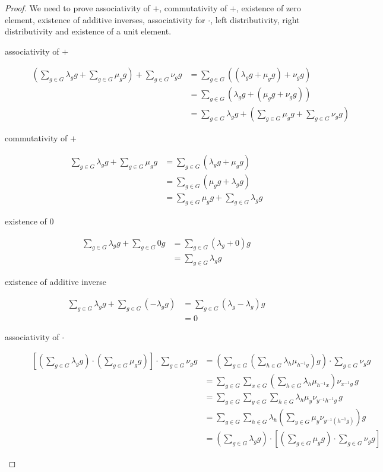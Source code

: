 \documentclass[titlepage, a4paper]{article}
\theoremstyle{remark}
\begin{document}
	\begin{proof}
		We need to prove associativity of $+$, commutativity of $+$, existence of zero element, existence of additive inverses, associativity for $\cdot$, left distributivity, right distributivity and existence of a unit element.
		\begin{description}
		\item[associativity of $+$]
		\begin{align*}
		\left(\sum_{g \in G} \lambda_g g + \sum_{g \in G} \mu_g g\right)+ \sum_{g \in G} \nu_g g
		&= \sum_{g \in G} \left((\lambda_g g + \mu_g g)+\nu_g g\right) \\
		&= \sum_{g \in G} \left(\lambda_g g + (\mu_g g+\nu_g g)\right) \\
		&= \sum_{g \in G} \lambda_g g + \left(\sum_{g \in G} \mu_g g + \sum_{g \in G} \nu_g g \right)
		\end{align*}
	
		\item[commutativity of $+$]
		\begin{align*}
		\sum_{g \in G} \lambda_g g + \sum_{g \in G} \mu_g g
		&= \sum_{g \in G} (\lambda_g g + \mu_g g) \\
		&= \sum_{g \in G} (\mu_g g + \lambda_g g) \\
		&= \sum_{g \in G} \mu_g g + \sum_{g \in G} \lambda_g g 
		\end{align*}
	
		\item[existence of $0$]
		\begin{align*}
		\sum_{g \in G} \lambda_g g + \sum_{g \in G} 0 g
		&= \sum_{g \in G} (\lambda_g + 0)g \\
		&= \sum_{g \in G} \lambda_g g
		\end{align*}
	
		\item[existence of additive inverse]
		\begin{align*}
		\sum_{g \in G} \lambda_g g + \sum_{g \in G} (-\lambda_g g)
		&= \sum_{g \in G} (\lambda_g - \lambda_g) g \\
		&= 0
		\end{align*}
	
		\item[associativity of $\cdot$]
		\begin{align*}
		\left[\left(\sum_{g \in G} \lambda_g g \right) \cdot \left(\sum_{g \in G} \mu_g g \right)\right ] \cdot \sum_{g \in G} \nu_g g
		&= \left(\sum_{g \in G} \left( \sum_{h \in G} \lambda_{h} \mu_{h^{-1}g} \right) g \right) \cdot \sum_{g \in G} \nu_g g\\
		&= \sum_{g \in G} \sum_{x \in G} \left( \sum_{h \in G} \lambda_{h} \mu_{h^{-1}x} \right) \nu_{x^{-1}g} \,g \\
		&= \sum_{g \in G} \sum_{y \in G} \sum_{h \in G} \lambda_{h} \mu_{y} \nu_{y^{-1} h^{-1}g} \, g \\
		&= \sum_{g \in G} \sum_{h \in G} \lambda_h \left(\sum_{y \in G}\mu_{y} \nu_{y^{-1} (h^{-1}g)}\right)g \\
		&= \left(\sum_{g \in G} \lambda_g g \right) \cdot \left[ \left(\sum_{g \in G} \mu_g g \right) \cdot \sum_{g \in G} \nu_g g \right]
		\end{align*}
	

\end{description}
\end{proof}
\end{document}
